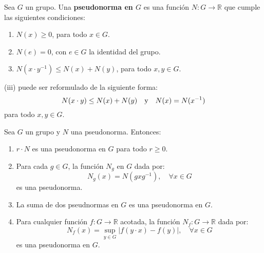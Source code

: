 \documentclass[12pt]{report}
\theoremstyle{largebreak}
\newcommand\abs[1]{\ensuremath{\lvert#1\rvert}}
\newcommand{\cf}[3]{\ensuremath{#1:#2\rightarrow#3}}
\begin{document}
    \begin{mydef}
        Sea $G$ un grupo. Una \textbf{pseudonorma en $G$} es una función $\cf{N}{G}{\mathbb{R}}$ que cumple las siguientes condiciones:
        \renewcommand{\theenumi}{\roman{enumi}}
        \begin{enumerate}
            \item $N(x)\geq0$, para todo $x\in G$.
            \item $N(e)=0$, con $e\in G$ la identidad del grupo.
            \item $N(x\cdot y^{-1})\leq N(x)+N(y)$, para todo $x,y\in G$.
        \end{enumerate}
        (iii) puede ser reformulado de la siguiente forma:
        \begin{equation*}
            N(x\cdot y)\leq N(x)+N(y)\quad\textup{y}\quad N(x)=N(x^{-1})
        \end{equation*}
        para todo $x,y\in G$.
    \end{mydef}

    \begin{propo}
        Sea $G$ un grupo y $N$ una pseudonorma. Entonces:
        \renewcommand{\theenumi}{\arabic{enumi}}
        \begin{enumerate}
            \item $r\cdot N$ es una pseudonorma en $G$ para todo $r\geq0$.
            \item Para cada $g\in G$, la función $N_g$ en $G$ dada por:
            \begin{equation*}
                N_g(x)=N(gxg^{-1}),\quad\forall x\in G
            \end{equation*}
            es una pseudonorma.
            \item La suma de dos pseudnormas en $G$ es una pseudonorma en $G$.
            \item Para cualquier función $\cf{f}{G}{\mathbb{R}}$ acotada, la función $\cf{N_f}{G}{\mathbb{R}}$ dada por:
            \begin{equation*}
                N_f(x)=\sup_{ y\in G}\abs{f(y\cdot x)-f(y)},\quad\forall x\in G
            \end{equation*}
            es una pseudonorma en $G$.
        \end{enumerate}
    \end{propo}
\end{document}
